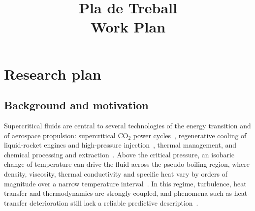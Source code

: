 \documentclass[11pt]{article}
\title{\textbf{Pla de Treball}\\[2pt]\large Work Plan}
\author{\Large \CandName}
\date{}
\begin{document}
\maketitle
\thispagestyle{plain}
\vspace{0.5cm}
\begin{center}\postdata\end{center}


\newpage
\tableofcontents

\section{Research plan}\label{sec:research}

\subsection{Background and motivation}
Supercritical fluids are central to several technologies of the energy transition and of
aerospace propulsion: supercritical CO$_2$ power cycles~\cite{Ahn2015}, regenerative
cooling of liquid-rocket engines and high-pressure injection~\cite{JofreUrzay2021},
thermal management, and chemical processing and extraction~\cite{Yoo2013}. Above the
critical pressure, an isobaric change of temperature can drive the fluid across the
pseudo-boiling region, where density, viscosity, thermal conductivity and specific heat
vary by orders of magnitude over a narrow temperature interval~\cite{Banuti2015}. In this
regime, turbulence, heat transfer and thermodynamics are strongly coupled, and phenomena
such as heat-transfer deterioration still lack a reliable predictive
description~\cite{Pizzarelli2018}.
\end{document}
